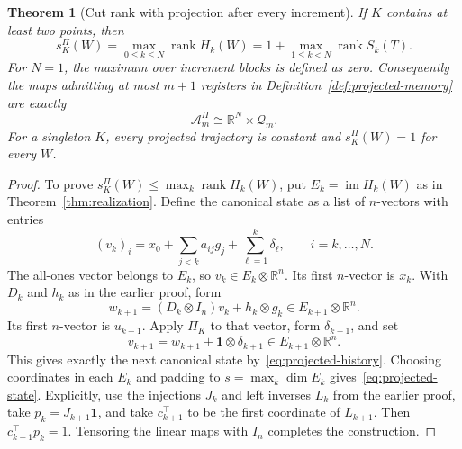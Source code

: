 \documentclass[11pt]{article}
\numberwithin{equation}{section}
\newtheorem{theorem}{Theorem}[section]
\theoremstyle{definition}
\newcommand{\R}{\mathbb R}
\newcommand{\A}{\mathcal A}
\newcommand{\Q}{\mathcal Q}
\DeclareMathOperator{\rank}{rank}
\DeclareMathOperator{\im}{im}
\begin{document}
\begin{samepage}
\begin{theorem}[Cut rank with projection after every increment]\label{thm:projected-rank}
If $K$ contains at least two points, then
\begin{equation}
 s_K^\Pi(W)=\max_{0\le k\le N}\rank H_k(W)
 =1+\max_{1\le k<N}\rank S_k(T).
 \label{eq:projected-rank}
\end{equation}
For $N=1$, the maximum over increment blocks is defined as zero. Consequently the maps admitting at most $m+1$ registers in Definition~\ref{def:projected-memory} are exactly
\[
 \A_m^\Pi\cong\R^N\times\Q_m.
\]
For a singleton $K$, every projected trajectory is constant and $s_K^\Pi(W)=1$ for every $W$.
\end{theorem}
\end{samepage}
\begin{proof}
To prove $s_K^\Pi(W)\le\max_k\rank H_k(W)$, put $E_k=\im H_k(W)$ as in Theorem~\ref{thm:realization}. Define the canonical state as a list of $n$-vectors with entries
\[
 (v_k)_i=x_0+\sum_{j<k}a_{ij}g_j+
                  \sum_{\ell=1}^k\delta_\ell,
 \qquad i=k,\ldots,N.
\]
The all-ones vector belongs to $E_k$, so $v_k\in E_k\otimes\R^n$. Its first $n$-vector is $x_k$. With $D_k$ and $h_k$ as in the earlier proof, form
\[
 w_{k+1}=(D_k\otimes I_n)v_k+h_k\otimes g_k
 \in E_{k+1}\otimes\R^n.
\]
Its first $n$-vector is $u_{k+1}$. Apply $\Pi_K$ to that vector, form $\delta_{k+1}$, and set
\[
 v_{k+1}=w_{k+1}+\mathbf 1\otimes\delta_{k+1}
 \in E_{k+1}\otimes\R^n.
\]
This gives exactly the next canonical state by~\eqref{eq:projected-history}. Choosing coordinates in each $E_k$ and padding to $s=\max_k\dim E_k$ gives~\eqref{eq:projected-state}. Explicitly, use the injections $J_k$ and left inverses $L_k$ from the earlier proof, take $p_k=J_{k+1}\mathbf 1$, and take $c_{k+1}^\top$ to be the first coordinate of $L_{k+1}$. Then $c_{k+1}^\top p_k=1$. Tensoring the linear maps with $I_n$ completes the construction.


\end{proof}
\end{document}
